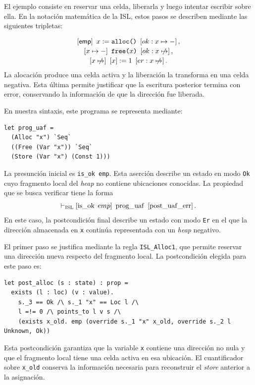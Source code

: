 \documentclass[a4paper,	11pt]{report}
\begin{document}
El ejemplo consiste en reservar una celda,
liberarla y luego intentar escribir sobre ella.
En la notación matemática de la ISL,
estos pasos se describen mediante las siguientes tripletas:

\[
\begin{array}{c}
  \itriple{\mathsf{emp}}{x := \texttt{alloc()}}{ok : x \mapsto -}, \\[2pt]

  \itriple{x \mapsto -}{\texttt{free(}x\texttt{)}}{ok : x \nmapsto}, \\[2pt]
  
  \itriple{x \nmapsto}{[x] := 1}{er : x \nmapsto}.
\end{array}
\]
La alocación produce una celda activa y la liberación la transforma en una celda negativa.
Esta última permite justificar que la escritura posterior termina con error,
conservando la información de que la dirección fue liberada.

En nuestra sintaxis,
este programa se representa mediante:

\begin{lstlisting}
let prog_uaf =
  (Alloc "x") `Seq`
  ((Free (Var "x")) `Seq`
  (Store (Var "x") (Const 1)))
\end{lstlisting}

La presunción inicial es \lstinline|is_ok emp|.
Esta aserción describe un estado en modo \lstinline|Ok| cuyo fragmento local del \emph{heap} no contiene ubicaciones conocidas.
La propiedad que se busca verificar tiene la forma
$$\vdash_\mathrm{ISL} \left\lbrack \operatorname{is\_ok} \; emp \right\rbrack~\operatorname{prog\_uaf}~\left\lbrack \operatorname{post\_uaf\_err} \right\rbrack.$$
En este caso,
la postcondición final describe un estado con modo \lstinline|Er| en el que la dirección almacenada en \lstinline|x| continúa representada con un \emph{heap} negativo.

El primer paso se justifica mediante la regla \lstinline|ISL_Alloc1|,
que permite reservar una dirección nueva respecto del fragmento local.
La postcondición elegida para este paso es:

\begin{lstlisting}
let post_alloc (s : state) : prop =
  exists (l : loc) (v : value).
    s._3 == Ok /\ s._1 "x" == Loc l /\
    l =!= 0 /\ points_to l v s /\
    (exists x_old. emp (override s._1 "x" x_old, override s._2 l Unknown, Ok))
\end{lstlisting}
Esta postcondición garantiza que la variable \lstinline|x| contiene una dirección no nula y que el fragmento local tiene una celda activa en esa ubicación.
El cuantificador sobre \lstinline|x_old| conserva la información necesaria para reconstruir el \emph{store} anterior a la asignación.
\end{document}
